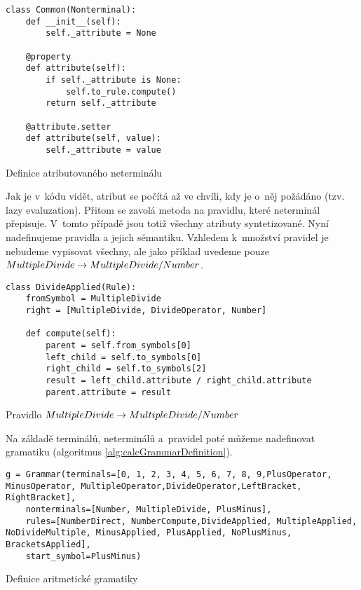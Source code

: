 		\begin{listing}
			\begin{verbatim}
class Common(Nonterminal):
	def __init__(self):
		self._attribute = None
	
	@property
	def attribute(self):
		if self._attribute is None:
			self.to_rule.compute()
		return self._attribute
	
	@attribute.setter
	def attribute(self, value):
		self._attribute = value
			\end{verbatim}
			\caption{Definice atributovaného neterminálu}
			\label{alg:calcAttributedNonterminal}
		\end{listing}
		
		Jak je v~kódu vidět, atribut se počítá až ve chvíli, kdy je o~něj požádáno (tzv. lazy evaluzation). Přitom se zavolá metoda  na pravidlu, které neterminál přepisuje. V~tomto případě jsou totiž všechny atributy syntetizované. Nyní nadefinujeme pravidla a jejich sémantiku. Vzhledem k~množství pravidel je nebudeme vypisovat všechny, ale jako příklad uvedeme pouze ${MultipleDivide} \allowbreak\rightarrow\allowbreak {MultipleDivide / Number}$.
		
		\begin{listing}
			\begin{verbatim}
class DivideApplied(Rule):
	fromSymbol = MultipleDivide
	right = [MultipleDivide, DivideOperator, Number]
	
	def compute(self):
		parent = self.from_symbols[0]
		left_child = self.to_symbols[0]
		right_child = self.to_symbols[2]
		result = left_child.attribute / right_child.attribute
		parent.attribute = result
			\end{verbatim}
			\caption{Pravidlo $\Rule{MultipleDivide}{MultipleDivide / Number}$}
			\label{alg:calcMultipleDivide}
		\end{listing}
		
		Na základě terminálů, neterminálů a~pravidel poté můžeme nadefinovat gramatiku (algoritmus \ref{alg:calcGrammarDefinition}).
		
		\begin{listing}
			\begin{verbatim}
g = Grammar(terminals=[0, 1, 2, 3, 4, 5, 6, 7, 8, 9,PlusOperator, MinusOperator, MultipleOperator,DivideOperator,LeftBracket, RightBracket],
	nonterminals=[Number, MultipleDivide, PlusMinus],
	rules=[NumberDirect, NumberCompute,DivideApplied, MultipleApplied, NoDivideMultiple, MinusApplied, PlusApplied, NoPlusMinus, BracketsApplied],
	start_symbol=PlusMinus)
			\end{verbatim}
			\caption{Definice aritmetické gramatiky}
			\label{alg:calcGrammarDefinition}
		\end{listing}
		
